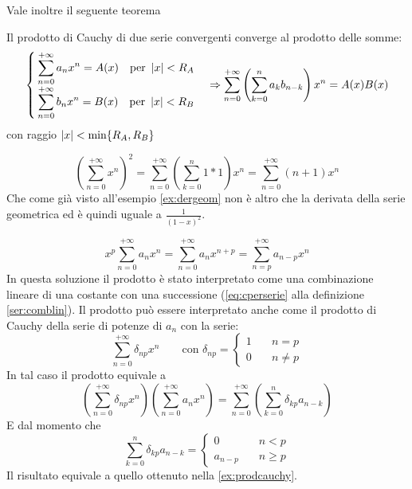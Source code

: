 Vale inoltre il seguente teorema
\begin{teor}
	Il prodotto di Cauchy di due serie convergenti converge al prodotto delle somme:
	\[
		\begin{cases}
			\displaystyle\sum_{n=0}^{+\infty}a_nx^n=A(x)\quad\text{per }\left\lvert x \right\rvert<R_A \\[2ex]
			\displaystyle\sum_{n=0}^{+\infty}b_nx^n=B(x)\quad\text{per }\left\lvert x \right\rvert<R_B
		\end{cases}\Rightarrow
		\sum_{n=0}^{+\infty}\left(\sum_{k=0}^na_kb_{n-k}\right)x^n=A(x)B(x)
	\]
	con raggio $\left\lvert x \right\rvert<\text{min}\{R_A,R_B\}$
\end{teor}
\begin{examp}
	\[
		\left(\sum_{n=0}^{+\infty}x^n\right)^2=\sum_{n=0}^{+\infty}\left(\sum_{k=0}^n 1*1\right)x^n=\sum_{n=0}^{+\infty}(n+1)x^n
	\]
	Che come già visto all'esempio \ref{ex:dergeom} non è altro che la derivata della serie geometrica ed è quindi uguale a $\frac{1}{(1-x)^2}$.
\end{examp}

\begin{examp}
	\begin{equation}
		\label{ex:prodcauchy}
		x^p\sum_{n=0}^{+\infty}a_nx^n=\sum_{n=0}^{+\infty}a_nx^{n+p}=\sum_{n=p}^{+\infty}a_{n-p}x^n
	\end{equation}
	In questa soluzione il prodotto è stato interpretato come una combinazione lineare di una costante con una successione (\ref{eq:cperserie} alla definizione \ref{ser:comblin}). Il prodotto può essere interpretato anche come il prodotto di Cauchy della serie di potenze di $a_n$ con la serie:
	\[
		\sum_{n=0}^{+\infty}\delta_{np}x^n\qquad\text{con }\delta_{np}=
		\begin{cases}
			1\quad & n=p     \\
			0\quad & n\neq p
		\end{cases}
	\]
	In tal caso il prodotto equivale a
	\[
		\left(\sum_{n=0}^{+\infty}\delta_{np}x^n\right)\left(\sum_{n=0}^{+\infty}a_nx^n\right)=\sum_{n=0}^{+\infty}\left(\sum_{k=0}^n \delta_{kp}a_{n-k}\right)
	\]
	E dal momento che
	\[
		\sum_{k=0}^n \delta_{kp}a_{n-k}=
		\begin{cases}
			0\quad       & n<p     \\
			a_{n-p}\quad & n\geq p
		\end{cases}
	\]
	Il risultato equivale a quello ottenuto nella \ref{ex:prodcauchy}.
\end{examp}


